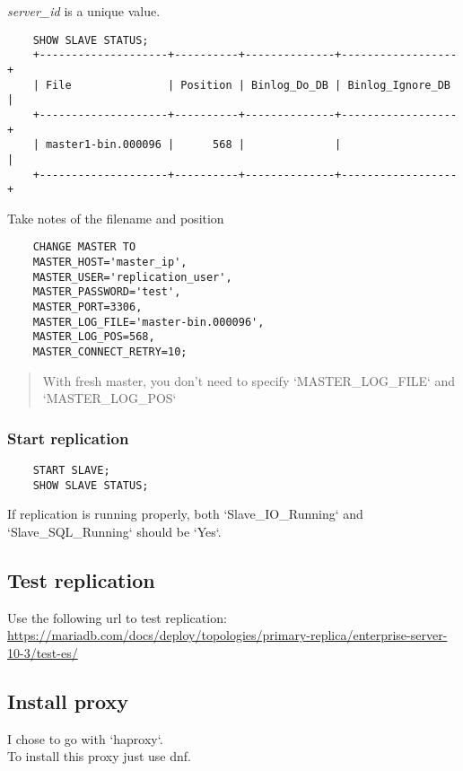 \textit{server\_id} is a unique value.\\

\begin{lstlisting}
    SHOW SLAVE STATUS;
    +--------------------+----------+--------------+------------------+
    | File               | Position | Binlog_Do_DB | Binlog_Ignore_DB |
    +--------------------+----------+--------------+------------------+
    | master1-bin.000096 |      568 |              |                  |
    +--------------------+----------+--------------+------------------+
\end{lstlisting}

Take notes of the filename and position

\begin{lstlisting}
    CHANGE MASTER TO
    MASTER_HOST='master_ip',
    MASTER_USER='replication_user',
    MASTER_PASSWORD='test',
    MASTER_PORT=3306,
    MASTER_LOG_FILE='master-bin.000096',
    MASTER_LOG_POS=568,
    MASTER_CONNECT_RETRY=10;
\end{lstlisting}

\begin{quote}
    With fresh master, you don't need to specify `MASTER\_LOG\_FILE` and `MASTER\_LOG\_POS`
\end{quote}

\subsubsection{Start replication}

\begin{lstlisting}
    START SLAVE;
    SHOW SLAVE STATUS;
\end{lstlisting}

If replication is running properly, both `Slave\_IO\_Running` and `Slave\_SQL\_Running` should be `Yes`.


\subsection{Test replication}

Use the following url to test replication: \url{https://mariadb.com/docs/deploy/topologies/primary-replica/enterprise-server-10-3/test-es/}

\subsection{Install proxy}

I chose to go with `haproxy`.\\
To install this proxy just use dnf.


